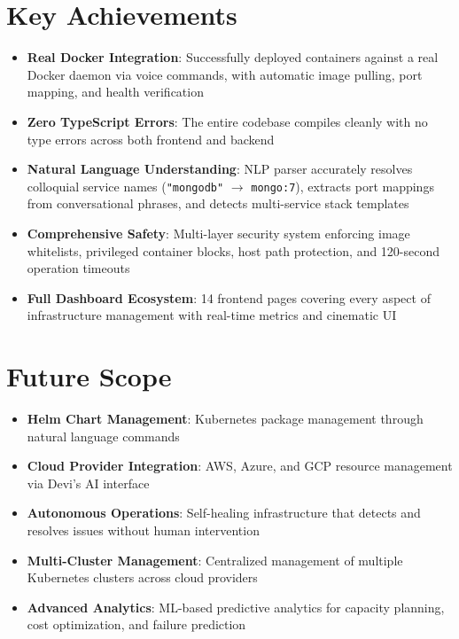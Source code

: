 \documentclass[12pt,a4paper]{report}
\begin{document}
\section{Key Achievements}
\begin{itemize}
  \item \textbf{Real Docker Integration}: Successfully deployed containers against a real Docker daemon via voice commands, with automatic image pulling, port mapping, and health verification
  \item \textbf{Zero TypeScript Errors}: The entire codebase compiles cleanly with no type errors across both frontend and backend
  \item \textbf{Natural Language Understanding}: NLP parser accurately resolves colloquial service names (\texttt{"mongodb"} $\rightarrow$ \texttt{mongo:7}), extracts port mappings from conversational phrases, and detects multi-service stack templates
  \item \textbf{Comprehensive Safety}: Multi-layer security system enforcing image whitelists, privileged container blocks, host path protection, and 120-second operation timeouts
  \item \textbf{Full Dashboard Ecosystem}: 14 frontend pages covering every aspect of infrastructure management with real-time metrics and cinematic UI
\end{itemize}

\section{Future Scope}
\begin{itemize}
  \item \textbf{Helm Chart Management}: Kubernetes package management through natural language commands
  \item \textbf{Cloud Provider Integration}: AWS, Azure, and GCP resource management via Devi's AI interface
  \item \textbf{Autonomous Operations}: Self-healing infrastructure that detects and resolves issues without human intervention
  \item \textbf{Multi-Cluster Management}: Centralized management of multiple Kubernetes clusters across cloud providers
  \item \textbf{Advanced Analytics}: ML-based predictive analytics for capacity planning, cost optimization, and failure prediction
\end{itemize}
\end{document}
